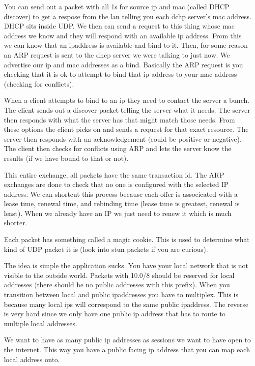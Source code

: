 \documentclass[12pt]{article}
\begin{document}
  
  
You can send out a packet with all 1s for source ip and mac (called DHCP discover) to get a respose from the lan telling you each dchp server's mac address. DHCP sits inside UDP. We then can send a request to this thing whose mac address we know and they will respond with an available ip address. From this we can know that an ipaddress is available and bind to it. Then, for some reason an ARP request is sent to the dhcp server we were talking to just now. We advertise our ip and mac addresses as a bind. Basically the ARP request is you checking that it is ok to attempt to bind that ip address to your mac address (checking for conflicts). 

  
  
When a client attempts to bind to an ip they need to contact the server a bunch. The client sends out a discover packet telling the server what it needs. The server then responds with what the server has that might match those needs. From these options the client picks on and sends a request for that exact resource. The server then responds with an acknowledgement (could be positive or negative). The client then checks for conflicts using ARP and lets the server know the results (if we have bound to that or not).

This entire exchange, all packets have the same transaction id. The ARP exchanges are done to check that no one is configured with the selected IP address. We can shortcut this process because each offer is associeated with a lease time, renewal time, and rebinding time (lease time is greatest, renewal is least). When we already have an IP we just need to renew it which is much shorter. 

Each packet has something called a magic cookie. This is used to determine what kind of UDP packet it is (look into stun packets if you are curious).

  
The idea is simple the application sucks. You have your local network that is not visible to the outside world. Packets with 10.0/8 should be reserved for local addresses (there should be no public addresses with this prefix). When you transition between local and public ipaddresses you have to multiplex. This is because many local ips will correspond to the same public ipaddress. The reverse is very hard since we only have one public ip address that has to route to multiple local addresses. 

  
We want to have as many public ip addresses as sessions we want to have open to the internet. This way you have a public facing ip address that you can map each local address onto. 
\end{document}
